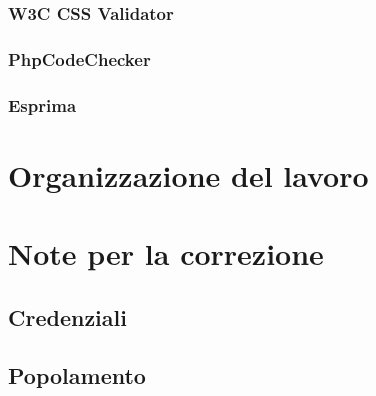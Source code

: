 \documentclass[a4paper]{article}
\begin{document}
			\subsubsection{W3C CSS Validator}
				
			\subsubsection{PhpCodeChecker}
				
			\subsubsection{Esprima}
				
				
	\newpage

	\section{Organizzazione del lavoro}
		
	
	\newpage
	
	\appendix
	\section{Note per la correzione}
		
		\subsection{Credenziali}
			
		\subsection{Popolamento}
			
    
\end{document}

